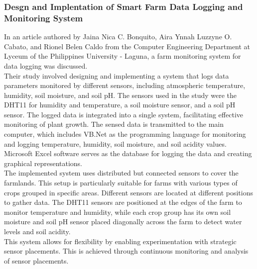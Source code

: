 \documentclass[12pt, a4paper]{article}
\begin{document}
\subsubsection{Desgn and Implentation of Smart Farm Data Logging and Monitoring System}
In an article authored by Jaina Nica C. Bonquito, Aira Ynnah Luzzyne O. Cabato, and Rionel Belen Caldo \cite{bongulto2016design} from the Computer Engineering Department at Lyceum of the Philippines University - Laguna, a farm monitoring system for data logging was discussed.\\
Their study involved designing and implementing a system that logs data parameters monitored by different sensors, including atmospheric temperature, humidity, soil moisture, and soil pH. The sensors used in the study were the DHT11 for humidity and temperature, a soil moisture sensor, and a soil pH sensor. The logged data is integrated into a single system, facilitating effective monitoring of plant growth. The sensed data is transmitted to the main computer, which includes VB.Net as the programming language for monitoring and logging temperature, humidity, soil moisture, and soil acidity values. Microsoft Excel software serves as the database for logging the data and creating graphical representations.\\
The implemented system uses distributed but connected sensors to cover the farmlands. This setup is particularly suitable for farms with various types of crops grouped in specific areas. Different sensors are located at different positions to gather data. The DHT11 sensors are positioned at the edges of the farm to monitor temperature and humidity, while each crop group has its own soil moisture and soil pH sensor placed diagonally across the farm to detect water levels and soil acidity.\\
This system allows for flexibility by enabling experimentation with strategic sensor placements. This is achieved through continuous monitoring and analysis of sensor placements.
  
\end{document}
